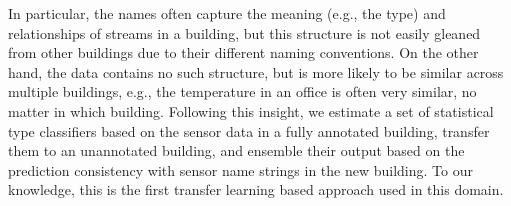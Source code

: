In particular, the names often capture the meaning (e.g., the type) and relationships of streams in a building, but this structure is not easily gleaned from other buildings due to their different naming conventions.
On the other hand, the data contains no such structure, but is more likely to be similar across multiple buildings, e.g., the temperature in an office is often very similar, no matter in which building.
Following this insight, we estimate a set of statistical type classifiers based on the sensor data in a fully annotated building, transfer them to an unannotated building, and ensemble their output based on the prediction consistency with sensor name strings in the new building.
To our knowledge, this is the first transfer learning based approach used in this domain.


